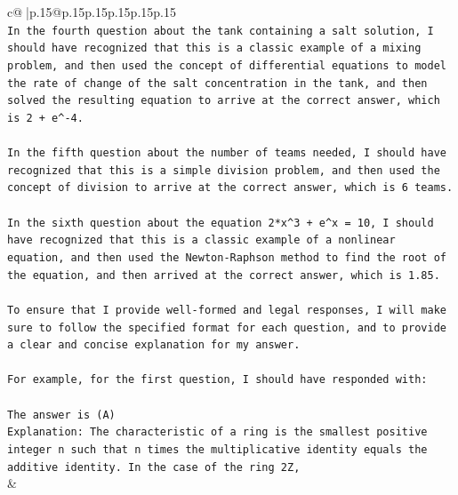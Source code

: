 \documentclass{article}
\begin{document}
{\begin{supertabular}{c@{$\;$}|p{.15\linewidth}@{}p{.15\linewidth}p{.15\linewidth}p{.15\linewidth}p{.15\linewidth}p{.15\linewidth}}
{{{\\ 
\texttt{In the fourth question about the tank containing a salt solution, I should have recognized that this is a classic example of a mixing problem, and then used the concept of differential equations to model the rate of change of the salt concentration in the tank, and then solved the resulting equation to arrive at the correct answer, which is 2 + e\^{}{-}4.} \\
\\ 
\texttt{In the fifth question about the number of teams needed, I should have recognized that this is a simple division problem, and then used the concept of division to arrive at the correct answer, which is 6 teams.} \\
\\ 
\texttt{In the sixth question about the equation 2*x\^{}3 + e\^{}x = 10, I should have recognized that this is a classic example of a nonlinear equation, and then used the Newton{-}Raphson method to find the root of the equation, and then arrived at the correct answer, which is 1.85.} \\
\\ 
\texttt{To ensure that I provide well{-}formed and legal responses, I will make sure to follow the specified format for each question, and to provide a clear and concise explanation for my answer.} \\
\\ 
\texttt{For example, for the first question, I should have responded with:} \\
\\ 
\texttt{The answer is (A)} \\
\texttt{Explanation: The characteristic of a ring is the smallest positive integer n such that n times the multiplicative identity equals the additive identity. In the case of the ring 2Z,} \\
            }
        }
    }
    & \\ \\

\end{supertabular}
}
\end{document}
